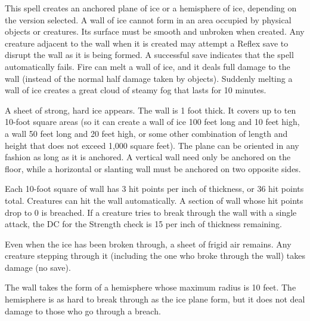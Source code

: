 \spellrng{\rngmed}
\spelldur{\durmed}
\begin{spelleffect}
  This spell creates an anchored plane of ice or a hemisphere of ice, depending on the version selected. A wall of ice cannot form in an area occupied by physical objects or creatures. Its surface must be smooth and unbroken when created. Any creature adjacent to the wall when it is created may attempt a Reflex save to disrupt the wall as it is being formed. A successful save indicates that the spell automatically fails. Fire can melt a wall of ice, and it deals full damage to the wall (instead of the normal half damage taken by objects). Suddenly melting a wall of ice creates a great cloud of steamy fog that lasts for 10 minutes.
  \par {} A sheet of strong, hard ice appears. The wall is 1 foot thick. It covers up to ten 10-foot square areas (so it can create a wall of ice 100 feet long and 10 feet high, a wall 50 feet long and 20 feet high, or some other combination of length and height that does not exceed 1,000 square feet). The plane can be oriented in any fashion as long as it is anchored. A vertical wall need only be anchored on the floor, while a horizontal or slanting wall must be anchored on two opposite sides.
  \par Each 10-foot square of wall has 3 hit points per inch of thickness, or 36 hit points total. Creatures can hit the wall automatically. A section of wall whose hit points drop to 0 is breached. If a creature tries to break through the wall with a single attack, the DC for the Strength check is 15  per inch of thickness remaining.
  \par Even when the ice has been broken through, a sheet of frigid air remains. Any creature stepping through it (including the one who broke through the wall) takes damage (no save).
  \par {} The wall takes the form of a hemisphere whose maximum radius is 10 feet. The hemisphere is as hard to break through as the ice plane form, but it does not deal damage to those who go through a breach.
\end{spelleffect}

